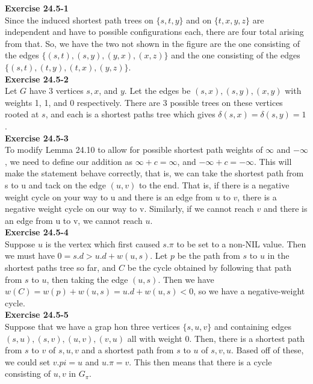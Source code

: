 \documentclass{article}
\begin{document}
\noindent\textbf{Exercise 24.5-1}\\

Since the induced shortest path trees on $\{s,t,y\}$ and on $\{t,x,y,z\}$ are independent and have to possible configurations each, there are four total arising from that. So, we have the two not shown in the figure are the one consisting of the edges $\{(s,t),(s,y),(y,x),(x,z)\}$ and the one consisting of the edges $\{(s,t),(t,y),(t,x),(y,z)\}$.\\

\noindent\textbf{Exercise 24.5-2}\\

Let $G$ have 3 vertices $s, x$, and $y$. Let the edges be $(s,x), (s,y), (x,y)$ with weights 1, 1, and 0 respectively.  There are 3 possible trees on these vertices rooted at $s$, and each is a shortest paths tree which gives $\delta(s,x) = \delta(s,y) = 1$. \\

\noindent\textbf{Exercise 24.5-3}\\

To modify Lemma 24.10 to allow for possible shortest path weights of $\infty$ and $-\infty$, we need to define our addition as $\infty + c = \infty$, and $-\infty + c = -\infty$. This will make the statement behave correctly, that is, we can take the shortest path from s to u and tack on the edge $(u,v)$ to the end. That is, if there is a negative weight cycle on your way to u and there is an edge from $u$ to $v$, there is a negative weight cycle on our way to v. Similarly, if we cannot reach $v$ and there is an edge from u to v, we cannot reach $u$.\\

\noindent\textbf{Exercise 24.5-4}\\

Suppose $u$ is the vertex which first caused $s.\pi$ to be set to a non-NIL value.  Then we must have $0 = s.d > u.d + w(u,s)$. Let $p$ be the path from $s$ to $u$ in the shortest paths tree so far, and $C$ be the cycle obtained by following that path from $s$ to $u$, then taking the edge $(u,s)$.  Then we have $w(C) = w(p) + w(u,s) = u.d + w(u,s) < 0$, so we have a negative-weight cycle. \\


\noindent\textbf{Exercise 24.5-5}\\

Suppose that we have a grap hon three vertices $\{s,u,v\}$ and containing edges $(s,u),(s,v),(u,v),(v,u)$ all with weight 0. Then, there is a shortest path from $s$ to $v$ of $s,u,v$ and a shortest path from $s$ to $u$ of $s,v,u$. Based off of these, we could set $v.pi= u$ and $u.\pi = v$. This then means that there is a cycle consisting of $u,v$ in $G_\pi$.\\
\end{document}
